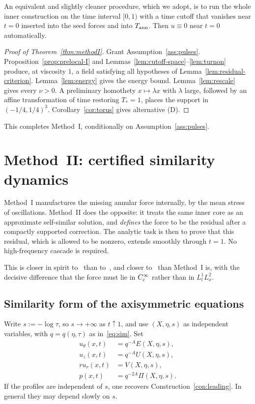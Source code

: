 An equivalent and slightly cleaner procedure, which we adopt, is to run the whole inner construction on the time interval $[0,1)$ with a time cutoff that vanishes near $t=0$ inserted into the seed forces and into $T_{\mathrm{ann}}$. Then $u\equiv 0$ near $t=0$ automatically.

\begin{proof}[Proof of Theorem~\ref{thm:methodI}]
Grant Assumption~\ref{ass:pulses}. Proposition~\ref{prop:prelocal-I} and Lemmas~\ref{lem:cutoff-space}--\ref{lem:turnon} produce, at viscosity $1$, a field satisfying all hypotheses of Lemma~\ref{lem:residual-criterion}. Lemma~\ref{lem:energy} gives the energy bound. Lemma~\ref{lem:rescale} gives every $\nu>0$. A preliminary homothety $x\mapsto \lambda x$ with $\lambda$ large, followed by an affine transformation of time restoring $T_*=1$, places the support in $(-1/4,1/4)^3$. Corollary~\ref{cor:torus} gives alternative (D).
\end{proof}

This completes Method~I, conditionally on Assumption~\ref{ass:pulses}.

\section{Method~II: certified similarity dynamics}
\label{sec:methodII}

Method~I manufactures the missing annular force internally, by the mean stress of oscillations. Method~II does the opposite: it treats the same inner core as an approximate self-similar solution, and \emph{defines} the force to be the residual after a compactly supported correction. The analytic task is then to prove that this residual, which is allowed to be nonzero, extends smoothly through $t=1$. No high-frequency cascade is required.

This is closer in spirit to~\cite{chenhou2022,anandkumar2026} than to~\cite{cmz2023}, and closer to~\cite{abc2022} than Method~I is, with the decisive difference that the force must lie in $C_c^\infty$ rather than in $L^1_t L^2_x$.

\subsection{Similarity form of the axisymmetric equations}
\label{sec:sim-NS}

Write $s:=-\log\tau$, so $s\to+\infty$ as $t\uparrow 1$, and use $(X,\eta,s)$ as independent variables, with $q=q(\eta,\tau)$ as in~\eqref{eq:sim}. Set
\begin{equation}
\label{eq:self-field}
\begin{aligned}
u_\theta(x,t)&=q^{-A} E(X,\eta,s),\\
u_z(x,t)&=q^{-A} U(X,\eta,s),\\
r u_r(x,t)&=V(X,\eta,s),\\
p(x,t)&=q^{-2A}\Pi(X,\eta,s).
\end{aligned}
\end{equation}
If the profiles are independent of $s$, one recovers Construction~\ref{con:leading}. In general they may depend slowly on $s$.

